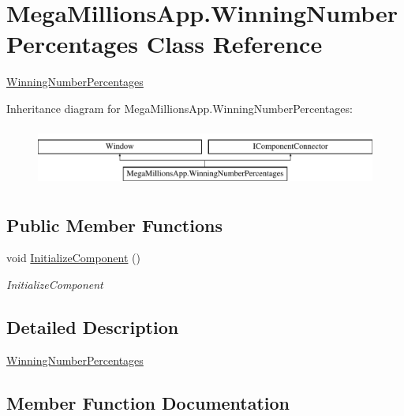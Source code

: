 \hypertarget{class_mega_millions_app_1_1_winning_number_percentages}{}\section{Mega\+Millions\+App.\+Winning\+Number\+Percentages Class Reference}
\label{class_mega_millions_app_1_1_winning_number_percentages}


\hyperlink{class_mega_millions_app_1_1_winning_number_percentages}{Winning\+Number\+Percentages}  


Inheritance diagram for Mega\+Millions\+App.\+Winning\+Number\+Percentages\+:\begin{figure}[H]
\begin{center}
\leavevmode
\includegraphics[height=1.985816cm]{class_mega_millions_app_1_1_winning_number_percentages}
\end{center}
\end{figure}
\subsection*{Public Member Functions}
\begin{DoxyCompactItemize}
\item 
void \hyperlink{class_mega_millions_app_1_1_winning_number_percentages_afbad6b66eb29260529af34c7d2606c18}{Initialize\+Component} ()
\begin{DoxyCompactList}\small\item\em Initialize\+Component \end{DoxyCompactList}\end{DoxyCompactItemize}


\subsection{Detailed Description}
\hyperlink{class_mega_millions_app_1_1_winning_number_percentages}{Winning\+Number\+Percentages} 



\subsection{Member Function Documentation}
\mbox{\label{class_mega_millions_app_1_1_winning_number_percentages_afbad6b66eb29260529af34c7d2606c18}} 
